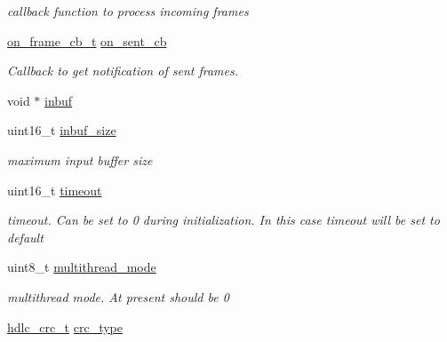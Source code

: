 \begin{DoxyCompactItemize}
\begin{DoxyCompactList}\small\item\em callback function to process incoming frames \end{DoxyCompactList}\item 
\mbox{\label{structSTinyHdInit___aa1d724d6a284de5f995273e0e3e70318}} 
\hyperlink{tiny__types_8h_ad6bf709565b8aecb9e6ecf196f219d54}{on\+\_\+frame\+\_\+cb\+\_\+t} \hyperlink{structSTinyHdInit___aa1d724d6a284de5f995273e0e3e70318}{on\+\_\+sent\+\_\+cb}
\begin{DoxyCompactList}\small\item\em Callback to get notification of sent frames. \end{DoxyCompactList}\item 
void $\ast$ \hyperlink{structSTinyHdInit___a5996a48606a90ff9938e4037612cf97d}{inbuf}
\item 
\mbox{\label{structSTinyHdInit___a0eed47c62a16fa29435d480541989cf6}} 
uint16\+\_\+t \hyperlink{structSTinyHdInit___a0eed47c62a16fa29435d480541989cf6}{inbuf\+\_\+size}
\begin{DoxyCompactList}\small\item\em maximum input buffer size \end{DoxyCompactList}\item 
\mbox{\label{structSTinyHdInit___ac7a1ae9314efc1296d78927198f07ac8}} 
uint16\+\_\+t \hyperlink{structSTinyHdInit___ac7a1ae9314efc1296d78927198f07ac8}{timeout}
\begin{DoxyCompactList}\small\item\em timeout. Can be set to 0 during initialization. In this case timeout will be set to default \end{DoxyCompactList}\item 
\mbox{\label{structSTinyHdInit___a404947e25922fa8400daa924a032897e}} 
uint8\+\_\+t \hyperlink{structSTinyHdInit___a404947e25922fa8400daa924a032897e}{multithread\+\_\+mode}
\begin{DoxyCompactList}\small\item\em multithread mode. At present should be 0 \end{DoxyCompactList}\item 
\hyperlink{group__HDLC__API_gabb73b32d08d8e79eefe9385634a74bf7}{hdlc\+\_\+crc\+\_\+t} \hyperlink{structSTinyHdInit___a520f9fbb19f5ec84f3f86a10d819faf4}{crc\+\_\+type}
\end{DoxyCompactItemize}


